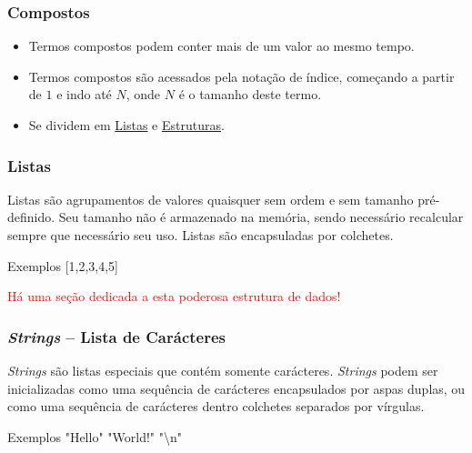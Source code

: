
\begin{frame}
	\frametitle{Compostos}
	\begin{itemize}
	  \item 	Termos compostos podem conter mais de um valor ao mesmo tempo. 
	  
	  \pause
    \item   Termos compostos são 
	acessados pela notação de índice, começando a partir de $1$ e indo até $N$, onde $N$
	 é o tamanho deste termo.

	  \pause
    \item 	Se dividem em \underline{Listas} e \underline{Estruturas}.
	
    
	\end{itemize}
	
	
	
\end{frame}


\begin{frame}
	\frametitle{Listas}
	
	Listas são agrupamentos de valores quaisquer sem ordem e sem tamanho pré-definido. Seu tamanho não é 
	armazenado na memória, sendo necessário recalcular sempre que necessário seu uso. Listas são 
	encapsuladas por colchetes.
	
	\begin{block}{Exemplos}
		[1,2,3,4,5] \: [a,b,32,1.5,aaac] \: ["string",14,22]
	\end{block}

\textcolor{red}{Há uma seção dedicada a esta poderosa  estrutura de dados!}
	
\end{frame}


\begin{frame}
	\frametitle{\textit{Strings} -- Lista de Carácteres}
	
	\textit{Strings} são listas especiais que contém somente carácteres. \textit{Strings} podem ser inicializadas como uma 
	sequência de carácteres encapsulados por aspas duplas, ou como uma sequência de carácteres dentro 
	colchetes separados por vírgulas.
	
	\begin{block}{Exemplos}
		"Hello" \: "World!" \: "\textbackslash n" \: [o,l,a,"\:",m,u,n,d,o] 
	\end{block}
	
\end{frame}

